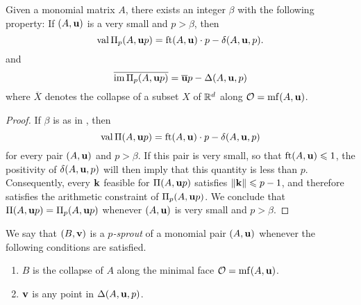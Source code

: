 \documentclass[11pt]{amsart}
\renewcommand{\!}[1]{{\color{red}\text{$\star$\,}#1\,$\star$}}
\newcommand{\ol}[1]{\overline{#1}}
\begin{document}

\begin{theorem}
\label{arithmetic uniform value and image: T}   Given a monomial matrix $A$, there exists an integer $\beta$ with the following property\textup:  
If $(A, \mathbf{u})$ is a very small and $p > \beta$, then  \[ \operatorname{val} \Pi_p(A, \mathbf{u}p) = \operatorname{ft}(A, \mathbf{u}) \cdot p - \delta(A, \mathbf{u}, p). \] 
and 
\[ \ol{ \im \IP_p(A, \vv{u}p)} = \ol{\vv{u}}p - \Delta(A, \vv{u}, p) \] where $\ol{X}$ denotes the collapse of a subset $X$ of $\mathbb{R}^d$ along $\mathcal{O} = \operatorname{mf}(A, \mathbf{u})$.
\end{theorem}

\begin{proof}  If $\beta$ is as in , then \[ \operatorname{val} \Pi(A, \mathbf{u}p) = \operatorname{ft}(A, \mathbf{u}) \cdot p - \delta(A, \mathbf{u}, p) \] for every pair $(A, \mathbf{u})$ and $p > \beta$.  If this pair is very small, so that $\operatorname{ft}(A, \mathbf{u}) \leqslant 1$, the positivity of $\delta(A, \mathbf{u},p)$ will then imply that this quantity is less than $p$.  Consequently, every $\mathbf{k}$ feasible for $\Pi(A, \mathbf{u}p)$ satisfies $\| \mathbf{k} \| \leqslant p-1$, and therefore satisfies the arithmetic constraint of $\Pi_p(A, \mathbf{u}p)$.  We conclude that $\Pi(A, \mathbf{u}p) = \Pi_p(A, \mathbf{u}p)$ whenever $(A, \mathbf{u})$ is very small and $p > \beta$.
\end{proof}



\begin{definition}
\label{p-sprout: D}
We say that $(B, \mathbf{v})$ is a \emph{$p$-sprout} of a monomial pair $(A, \mathbf{u})$ whenever the following conditions are satisfied.
\begin{enumerate}
\item $B$ is the collapse of $A$ along the minimal face $\mathcal{O} = \operatorname{mf}(A, \mathbf{u})$.
\item $\mathbf{v}$ is any point in $\Delta(A, \mathbf{u}, p)$.
\end{enumerate}
\end{definition}
\end{document}
